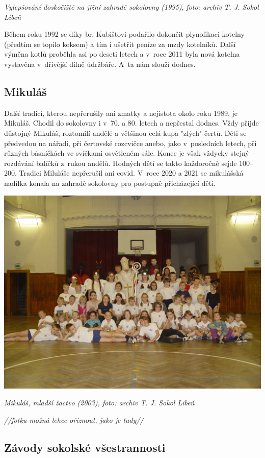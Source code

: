 \documentclass[a5paper, 11pt, twoside]{article}
\begin{document}
\textit{Vylepšování doskočiště na jižní zahradě sokolovny (1995),}
\textit{foto: archiv T. J. Sokol Libeň}

Během roku 1992 se díky br. Kubištovi podařilo dokončit plynofikaci
kotelny (předtím se topilo koksem) a tím i ušetřit peníze za mzdy
kotelníků. Další výměna kotlů proběhla asi po deseti letech a v~roce
2011 byla nová kotelna vystavěna v~dřívější dílně údržbáře. A~ta nám
slouží dodnes.

\subsection{Mikuláš}

Další tradicí, kterou nepřerušily ani zmatky a nejistota okolo roku
1989, je Mikuláš. Chodil do sokolovny i v~70. a 80. letech a nepřestal
dodnes. Vždy přijde důstojný Mikuláš, roztomilí andělé a většinou celá
kupa "zlých" čertů. Děti se předvedou na nářadí, při čertovské
rozcvičce anebo, jako v~posledních letech, při různých básničkách ve
svíčkami osvětleném sále. Konec je však vždycky stejný -- rozdávání
balíčků z~rukou andělů. Hodných dětí se takto každoročně sejde 100--200.
Tradici Miluláše nepřerušil ani covid. V~roce 2020 a 2021 se mikulášská
nadílka konala na zahradě sokolovny pro postupně přicházející děti.

 \includegraphics[width=\textwidth]{img/41_mikulas.JPG}

\textit{Mikuláš, mladší žactvo (2003), foto: archiv T. J. Sokol
Libeň}

\textit{//fotku možná lehce oříznout, jako je tady//}

\subsection{Závody sokolské všestrannosti}
\end{document}
